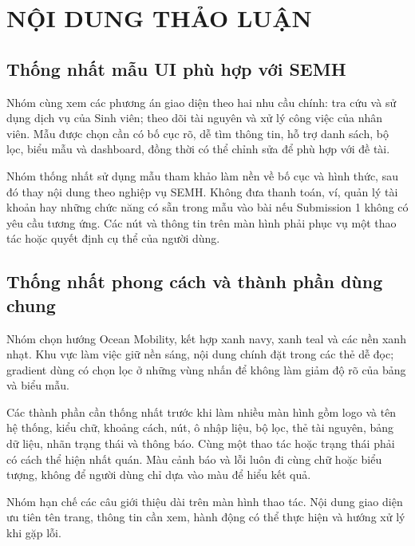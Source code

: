 \documentclass[10pt,a4paper]{article}
\begin{document}
\section{NỘI DUNG THẢO LUẬN}

\subsection{Thống nhất mẫu UI phù hợp với SEMH}
Nhóm cùng xem các phương án giao diện theo hai nhu cầu chính: tra cứu và sử dụng dịch vụ của Sinh viên; theo dõi tài nguyên và xử lý công việc của nhân viên. Mẫu được chọn cần có bố cục rõ, dễ tìm thông tin, hỗ trợ danh sách, bộ lọc, biểu mẫu và dashboard, đồng thời có thể chỉnh sửa để phù hợp với đề tài.

Nhóm thống nhất sử dụng mẫu tham khảo làm nền về bố cục và hình thức, sau đó thay nội dung theo nghiệp vụ SEMH. Không đưa thanh toán, ví, quản lý tài khoản hay những chức năng có sẵn trong mẫu vào bài nếu Submission 1 không có yêu cầu tương ứng. Các nút và thông tin trên màn hình phải phục vụ một thao tác hoặc quyết định cụ thể của người dùng.

\subsection{Thống nhất phong cách và thành phần dùng chung}
Nhóm chọn hướng Ocean Mobility, kết hợp xanh navy, xanh teal và các nền xanh nhạt. Khu vực làm việc giữ nền sáng, nội dung chính đặt trong các thẻ dễ đọc; gradient dùng có chọn lọc ở những vùng nhấn để không làm giảm độ rõ của bảng và biểu mẫu.

Các thành phần cần thống nhất trước khi làm nhiều màn hình gồm logo và tên hệ thống, kiểu chữ, khoảng cách, nút, ô nhập liệu, bộ lọc, thẻ tài nguyên, bảng dữ liệu, nhãn trạng thái và thông báo. Cùng một thao tác hoặc trạng thái phải có cách thể hiện nhất quán. Màu cảnh báo và lỗi luôn đi cùng chữ hoặc biểu tượng, không để người dùng chỉ dựa vào màu để hiểu kết quả.

Nhóm hạn chế các câu giới thiệu dài trên màn hình thao tác. Nội dung giao diện ưu tiên tên trang, thông tin cần xem, hành động có thể thực hiện và hướng xử lý khi gặp lỗi.
\end{document}
